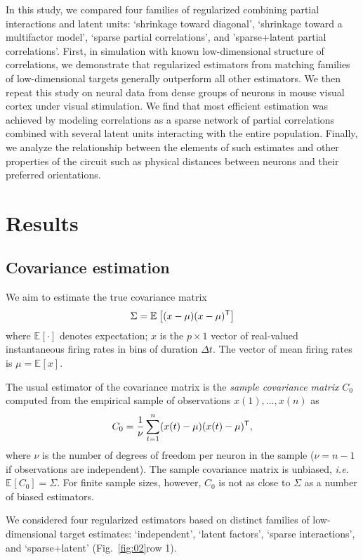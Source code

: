 \documentclass[10pt]{article}
\newcommand{\T}{{\sf T}}
\newcommand{\E}[2][]{\mathbb E_{#1}\left[ #2\right]}    %
\begin{document}
In this study, we compared four families of regularized combining partial interactions and latent units: `shrinkage toward diagonal', `shrinkage toward a multifactor model', `sparse partial correlations', and 'sparse+latent partial correlations'.  First, in simulation with known low-dimensional structure of correlations, we demonstrate that regularized estimators from matching families of low-dimensional targets generally outperform all other estimators. We then repeat this study on neural data from dense groups of neurons in mouse visual cortex under visual stimulation. We find that most efficient estimation was achieved by modeling correlations as a sparse network of partial correlations combined with several latent units interacting with the entire population. Finally, we analyze the relationship between the elements of such estimates and other properties of the circuit such as physical distances between neurons and their preferred orientations. 


\section*{Results}

\subsection*{Covariance estimation}
We aim to estimate the true covariance matrix 
\begin{equation}\label{eq:true-covariance}
\Sigma = \E{(x-\mu)(x-\mu)^\T}
\end{equation}
where $\E{\cdot}$ denotes expectation; $x$ is the $p\times 1$ vector of real-valued instantaneous firing rates in bins of duration $\Delta t$. The vector of mean firing rates is $\mu = \E{x}$.  

The usual estimator of the covariance matrix is the \emph{sample covariance matrix} $C_0$ computed from the empirical sample of observations $x(1),\ldots,x(n)$ as
\begin{equation}
C_0 = \frac 1 \nu \sum\limits_{t=1}^n (x(t)-\mu)(x(t)-\mu)^\T, 
\end{equation}
where $\nu$ is the number of degrees of freedom per neuron in the sample ($\nu=n-1$ if observations are independent).  
The sample covariance matrix is unbiased, \emph{i.e.} $\E{C_0}=\Sigma$.
For finite sample sizes, however, $C_0$ is not as close to $\Sigma$ as a number of biased estimators.

We considered four regularized estimators based on distinct families of low-dimensional target estimates: `independent', `latent factors', `sparse interactions', and `sparse+latent' (Fig.~\ref{fig:02}\;row 1).  
\end{document}
